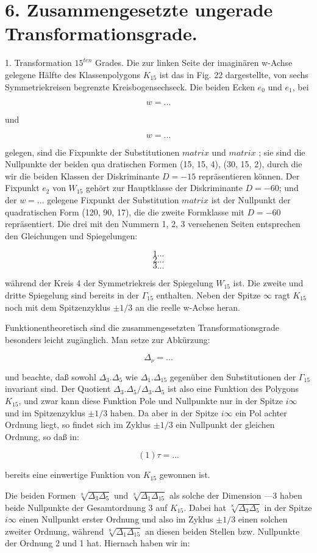 \documentclass{article}
\begin{document}
\section*{6. Zusammengesetzte ungerade Transformationsgrade.}

1. Transformation $15^{ten}$ Grades. Die zur linken Seite der imaginären w-Achse gelegene Hälfte des Klassenpolygons $K_15$ ist das in Fig. 22 dargestellte, von sechs Symmetriekreisen begrenzte Kreisbogensechseck. Die  beiden Ecken $e_0$ und $e_1$, bei 

$$w=...$$

und 

$$w=...$$

gelegen, sind die Fixpunkte der Substitutionen $matrix$ und $matrix$ ; sie sind die Nullpunkte der beiden qua dratischen Formen (15, 15, 4), (30, 15, 2), durch die wir die beiden Klassen der Diskriminante $D=-15$ repräsentieren können. Der Fixpunkt $e_2$ von $W_15$ gehört zur Hauptklasse der Diskriminante $D=-60$; und der $w=...$ gelegene Fixpunkt der Substitution $matrix$ ist der Nullpunkt der quadratischen Form (120, 90, 17), die die zweite Formklasse mit $D=-60$ repräsentiert. Die drei mit den Nummern 1, 2, 3 versehenen Seiten entsprechen den Gleichungen und Spiegelungen: 

$$1... $$
$$2... $$
$$3... $$

während der Kreis 4 der Symmetriekreis der Spiegelung $W_15$ ist. Die zweite und dritte Spiegelung sind bereits in der $\Gamma_15$ enthalten. Neben der Spitze $\infty$ ragt $K_15$ noch mit dem Spitzenzyklus $\pm1/3$ an die reelle w-Acbse heran. 

Funktionentheoretisch sind die zusammengesetzten Transformationsgrade besonders leicht zugänglich. Man setze zur Abkürzung: 

$$\Delta_\nu=...$$

und beachte, daß sowohl $\Delta_3.\Delta_5$ wie $\Delta_1.\Delta_15$ gegenüber den Substitutionen der $\Gamma_15$ invariant sind. Der Quotient $\Delta_3.\Delta_5/\Delta_3.\Delta_5$ ist also eine Funktion des Polygons $K_15$, und zwar kann diese Funktion Pole und Nullpunkte nur in der Spitze $i\infty$ und im Spitzenzyklus $\pm1/3$ haben. Da aber in der Spitze $i\infty$ ein Pol achter Ordnung liegt, so findet sich im Zyklus $\pm1/3$ ein Nullpunkt der gleichen Ordnung, so daß in: 

$$(1) \tau=...$$

bereits eine einwertige Funktion von $K_15$ gewonnen ist. 

Die beiden Formen $\sqrt[8]{\Delta_3\Delta_5}$ und $\sqrt[8]{\Delta_1\Delta_{15}}$ als solche der Dimension —3 haben beide Nullpunkte der Gesamtordnung 3 auf $K_15$. Dabei hat $\sqrt[8]{\Delta_3\Delta_5}$ in der Spitze $i\infty$ einen Nullpunkt erster Ordnung und also im Zyklus $\pm1/3$ einen solchen zweiter Ordnung, während $\sqrt[8]{\Delta_1\Delta_{15}}$ an diesen beiden Stellen bzw. Nullpunkte der Ordnung 2 und 1 hat. Hiernach haben wir in: 
\end{document}
